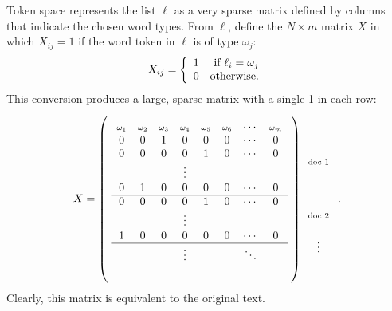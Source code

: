 \documentclass[12pt]{article}
\begin{document}
 Token space represents the list $\ell$ as a very sparse matrix
 defined by columns that indicate the chosen word types.  
 From $\ell$, define the $N \times m$ matrix
 $X$ in which $X_{ij} = 1$ if the \ith word token in $\ell$ is of type $\omega_j$:
 \begin{equation}
   X_{ij} = \left\{ \begin{array}{cc}
                   1 & \mbox{ if } \ell_i = \omega_j \cr
                   0 & \mbox{otherwise.}
                \end{array} \right.
 \end{equation}
 This conversion produces a large, sparse matrix with a single 1 in each row:
 \begin{equation}
  X =  \left( \rule{0em}{8em} \right.
  \begin{array}{cccccccc}
            \mbox{\scriptsize $\omega_1$} &
            \mbox{\scriptsize $\omega_2$} &
            \mbox{\scriptsize $\omega_3$} &
            \mbox{\scriptsize $\omega_4$} &
            \mbox{\scriptsize $\omega_5$} &
            \mbox{\scriptsize $\omega_6$} &   \cdots &
            \mbox{\scriptsize $\omega_m$}  \cr
            0  & 0 & 1 & 0 & 0 & 0 & \cdots & 0 \cr
            0  & 0  & 0 & 0 & 1 & 0 & \cdots & 0 \cr
             &&&  \vdots &&&&                                 \cr
            0  & 1  & 0 & 0 & 0 & 0 & \cdots & 0 \cr \hline
            0  & 0 & 0 & 0 & 1 & 0 & \cdots & 0 \cr
              &&&  \vdots &&&&                                 \cr
            1  & 0 & 0 & 0 & 0 & 0 & \cdots & 0 \cr \hline
              &&&  \vdots &&&\ddots&                                 \cr
              \\
           \end{array}
        \left. \rule{0em}{8em} \right)
          \begin{array}{c}
         \cr \mbox{\scriptsize{doc 1}} \cr \cr \cr \cr \mbox{\scriptsize{doc 2}} \cr \cr \vdots
  \end{array}
        \;.
    \label{eq:X}
 \end{equation}
 Clearly, this matrix is equivalent to the original text.
\end{document}
